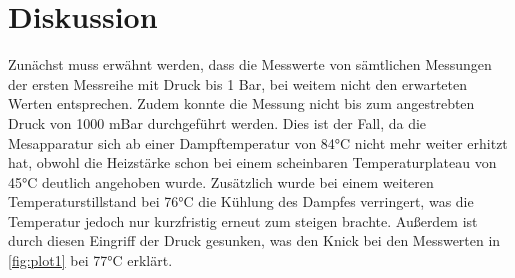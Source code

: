\section{Diskussion}
\label{sec:Diskussion}
Zunächst muss erwähnt werden, dass die Messwerte von sämtlichen Messungen der ersten Messreihe mit Druck bis 1 Bar, bei weitem nicht den erwarteten Werten entsprechen. Zudem konnte
die Messung nicht bis zum angestrebten Druck von 1000 mBar durchgeführt werden. Dies ist der Fall, da die Mesapparatur sich ab einer Dampftemperatur von 84°C nicht mehr weiter
erhitzt hat, obwohl die Heizstärke schon bei einem scheinbaren Temperaturplateau von 45°C deutlich angehoben wurde. Zusätzlich wurde bei einem weiteren Temperaturstillstand bei 76°C
die Kühlung des Dampfes verringert, was die Temperatur jedoch nur kurzfristig erneut zum steigen brachte. Außerdem ist durch diesen Eingriff der Druck gesunken, was den Knick bei
den Messwerten in \autoref{fig:plot1} bei 77°C erklärt.